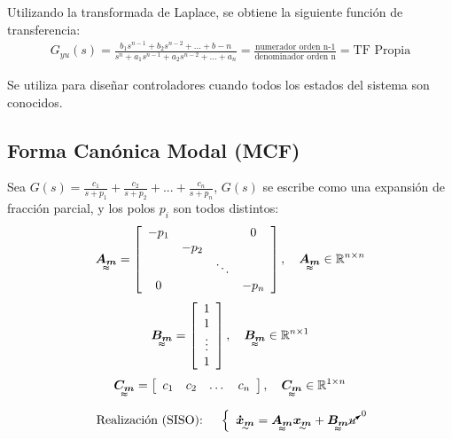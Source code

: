 Utilizando la transformada de Laplace, se obtiene la siguiente función de transferencia:
\begin{align*}
    G_{yu}(s)=\frac{b_1s^{n-1}+b_2s^{n-2}+...+b-n}{s^n+a_1s^{n-1}+a_2s^{n-2}+...+a_n} = \frac{\text{numerador orden n-1}}{\text{denominador orden n}} = \text{TF Propia}
\end{align*}

Se utiliza para diseñar controladores cuando todos los estados del sistema son conocidos.

\subsection{Forma Canónica Modal (MCF)}
Sea $G(s)=\frac{c_1}{s+p_1}+\frac{c_2}{s+p_2}+...+\frac{c_n}{s+p_n}$, $G(s)$ se escribe como una expansión de fracción parcial, y los polos $p_i$ son todos distintos:
\begin{align*}
\tenq{A_m}=\left[
    \begin{array}{cccc}
     -p_1& & & 0\\
     & -p_2 & & \\
     & & \ddots & \\
     0 & & & -p_n
    \end{array}\right], \quad \tenq{A_m}\in \mathbb{R}^{n\times n}
\end{align*}
\begin{align*}
\tenq{B_m}=\left[
    \begin{array}{c}
     1 \\ 
     1\\
    \vdots\\
     1  
    \end{array}\right], \quad \tenq{B_m}\in \mathbb{R}^{n\times 1}
\end{align*}
\begin{align*}
\tenq{C_m}=\left[
    \begin{array}{cccc}
     c_1 & c_2 & \dots & c_n
    \end{array}\right], \quad \tenq{C_m}\in \mathbb{R}^{1\times n}
\end{align*}

\begin{align*}
    \text{Realización (SISO): }\quad 
    \left\{
    \begin{array}{l}
          \tend{\dot{x}_m}=\tenq{A_m}\tend{x_m}+\tenq{B_m}\cancelto{0}{u} 
    \end{array} 
    \right. 
\end{align*}

